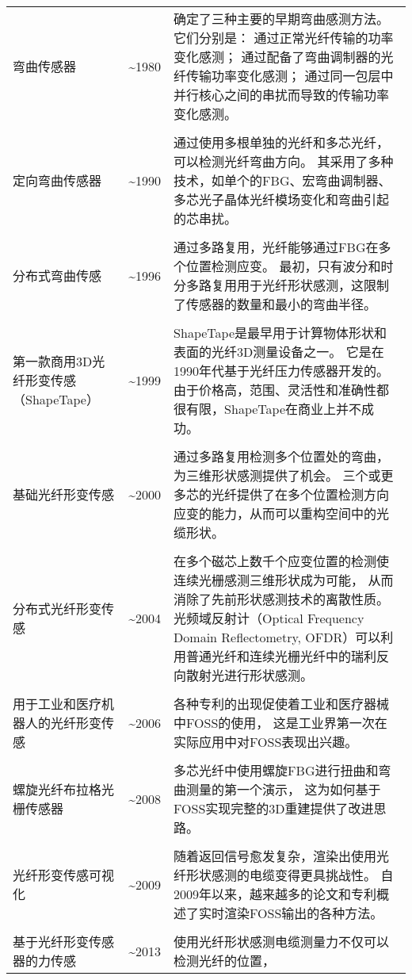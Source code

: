 \begin{table}
\begin{center}
\begin{tabular}{p{}cp{}}
弯曲传感器 & \textasciitilde 1980 & 确定了三种主要的早期弯曲感测方法。它们分别是：
通过正常光纤传输的功率变化感测；
通过配备了弯曲调制器的光纤传输功率变化感测；
通过同一包层中并行核心之间的串扰而导致的传输功率变化感测。
\\
\\
定向弯曲传感器 & \textasciitilde 1990 & 通过使用多根单独的光纤和多芯光纤，可以检测光纤弯曲方向。
其采用了多种技术，如单个的FBG、宏弯曲调制器、多芯光子晶体光纤模场变化和弯曲引起的芯串扰。
\\
\\
分布式弯曲传感 & \textasciitilde 1996 & 通过多路复用，光纤能够通过FBG在多个位置检测应变。 
最初，只有波分和时分多路复用用于光纤形状感测，这限制了传感器的数量和最小的弯曲半径。
\\
\\
第一款商用3D光纤形变传感（ShapeTape）& \textasciitilde 1999 & ShapeTape是最早用于计算物体形状和表面的光纤3D测量设备之一。 
它是在1990年代基于光纤压力传感器开发的。 
由于价格高，范围、灵活性和准确性都很有限，ShapeTape在商业上并不成功。
\\
\\
基础光纤形变传感 & \textasciitilde 2000 & 通过多路复用检测多个位置处的弯曲，为三维形状感测提供了机会。
三个或更多芯的光纤提供了在多个位置检测方向应变的能力，从而可以重构空间中的光缆形状。
\\
\\
分布式光纤形变传感 & \textasciitilde 2004 & 在多个磁芯上数千个应变位置的检测使连续光栅感测三维形状成为可能，
从而消除了先前形状感测技术的离散性质。 
光频域反射计（Optical Frequency Domain Reflectometry, OFDR）可以利用普通光纤和连续光栅光纤中的瑞利反向散射光进行形状感测。
\\
\\
用于工业和医疗机器人的光纤形变传感 & \textasciitilde 2006 & 各种专利的出现促使着工业和医疗器械中FOSS的使用，
这是工业界第一次在实际应用中对FOSS表现出兴趣。
\\
\\
螺旋光纤布拉格光栅传感器 & \textasciitilde 2008 & 多芯光纤中使用螺旋FBG进行扭曲和弯曲测量的第一个演示，
这为如何基于FOSS实现完整的3D重建提供了改进思路。
\\
\\
光纤形变传感可视化 & \textasciitilde 2009 & 随着返回信号愈发复杂，渲染出使用光纤形状感测的电缆变得更具挑战性。
自2009年以来，越来越多的论文和专利概述了实时渲染FOSS输出的各种方法。
\\
\\
基于光纤形变传感器的力传感 & \textasciitilde 2013 & 使用光纤形状感测电缆测量力不仅可以检测光纤的位置，

\end{tabular}
\end{center}
\end{table}
